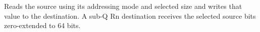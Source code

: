 Reads the source using its addressing mode and selected size and writes that value to the destination. A sub-Q Rn destination receives the selected source bits zero-extended to 64 bits.

